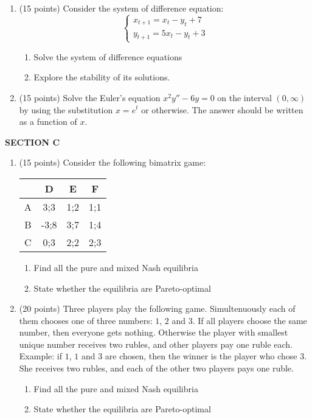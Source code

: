 \documentclass[12pt,a4paper]{article}
\begin{document}
\begin{enumerate}[resume]
\item (15 points)  Consider the system of difference equation:
\[
\begin{cases}
x_{t+1}=x_t-y_t+7 \\
y_{t+1}=5x_t-y_t+3
\end{cases}
\]

\begin{enumerate}
\item Solve the system of difference equations 
\item Explore the stability of its solutions.
\end{enumerate}

\item   (15 points)   Solve the  Euler’s equation $x^2y''-6y=0$ on the interval $(0,\infty)$ by using the substitution $x=e^t$ or otherwise. The answer should be written as a function of $x$.

\end{enumerate}


\textbf{SECTION C}

\begin{enumerate}[resume]
\item  (15 points)   Consider the following bimatrix game:


\begin{tabular}{c|ccc}
 & D & E & F \\ 
\hline 
A & 3;3 & 1;2 & 1;1  \\ 
B & -3;8 & 3;7 & 1;4  \\ 
C & 0;3 & 2;2 & 2;3  \\ 
\end{tabular} 

\begin{enumerate}
\item Find all the pure and mixed Nash equilibria
\item State whether the equilibria are Pareto-optimal
\end{enumerate}

\item  (20 points)  Three players play the following game. Simultenuously each of them chooses one of three numbers: $1$, $2$ and $3$. If all players choose the same number, then everyone gets nothing. Otherwise the player with smallest unique number receives two rubles, and other players pay one ruble each. Example: if $1$, $1$ and $3$ are chosen, then the winner is the player who chose $3$. She receives two rubles, and  each of the other two players pays one ruble.
\begin{enumerate}
\item Find all the pure and mixed Nash equilibria
\item State whether the equilibria are Pareto-optimal
\end{enumerate}



\end{enumerate}
\end{document}
